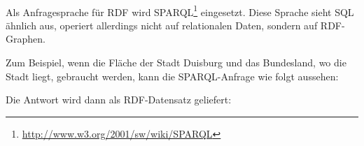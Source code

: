 \paragraph{}
Als Anfragesprache für RDF wird SPARQL\footnote{\url{http://www.w3.org/2001/sw/wiki/SPARQL}} eingesetzt. Diese Sprache sieht SQL ähnlich aus, operiert allerdings nicht auf relationalen Daten, sondern auf RDF-Graphen. 

Zum Beispiel, wenn die Fläche der Stadt Duisburg und das Bundesland, wo die Stadt liegt, gebraucht werden, kann die SPARQL-Anfrage wie folgt aussehen:
\lstset{language=SPARQL}


Die Antwort wird dann als RDF-Datensatz geliefert:
\lstset{language=XML}
